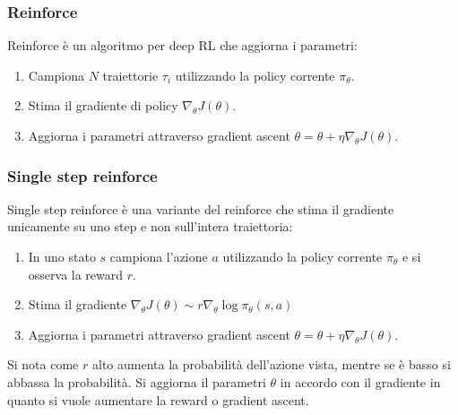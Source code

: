 		\subsubsection{Reinforce}
		Reinforce \`e un algoritmo per deep RL che aggiorna i parametri:
		\begin{enumerate}
			\item Campiona $N$ traiettorie $\tau_i$ utilizzando la policy corrente $\pi_\theta$.
			\item Stima il gradiente di policy $\nabla_\theta J(\theta)$.
			\item Aggiorna i parametri attraverso gradient ascent $\theta = \theta + \eta\nabla_\theta J(\theta)$.
		\end{enumerate}
		
		\subsubsection{Single step reinforce}
		Single step reinforce \`e una variante del reinforce che stima il gradiente unicamente su uno step e non sull'intera traiettoria:
		\begin{enumerate}
			\item In uno stato $s$ campiona l'azione $a$ utilizzando la policy corrente $\pi_\theta$ e si osserva la reward $r$.
			\item Stima il gradiente $\nabla_\theta J(\theta)\sim r\nabla_\theta\log\pi_\theta(s,a)$
			\item Aggiorna i parametri attraverso gradient ascent $\theta = \theta + \eta\nabla_\theta J(\theta)$.
		\end{enumerate}
		Si nota come $r$ alto aumenta la probabilit\`a dell'azione vista, mentre se \`e basso si abbassa la probabilit\`a.
		Si aggiorna il parametri $\theta$ in accordo con il gradiente in quanto si vuole aumentare la reward o gradient ascent.
